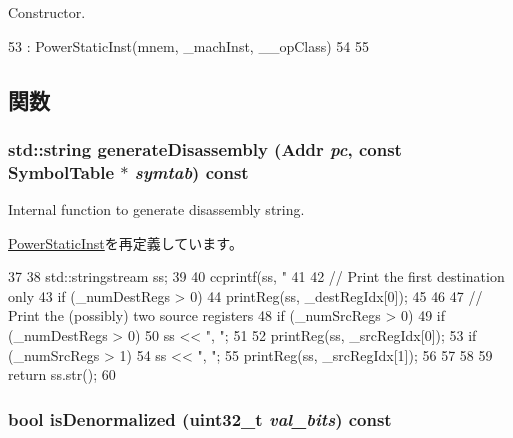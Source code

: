Constructor. 


\begin{DoxyCode}
53       : PowerStaticInst(mnem, _machInst, __opClass)
54     {
55     }
\end{DoxyCode}


\subsection{関数}
\hypertarget{classPowerISA_1_1FloatOp_a95d323a22a5f07e14d6b4c9385a91896}{
\subsubsection[{generateDisassembly}]{\setlength{\rightskip}{0pt plus 5cm}std::string generateDisassembly ({\bf Addr} {\em pc}, \/  const SymbolTable $\ast$ {\em symtab}) const}}
\label{classPowerISA_1_1FloatOp_a95d323a22a5f07e14d6b4c9385a91896}
Internal function to generate disassembly string. 

\hyperlink{classPowerISA_1_1PowerStaticInst_a95d323a22a5f07e14d6b4c9385a91896}{PowerStaticInst}を再定義しています。


\begin{DoxyCode}
37 {
38     std::stringstream ss;
39 
40     ccprintf(ss, "%
41 
42     // Print the first destination only
43     if (_numDestRegs > 0) {
44         printReg(ss, _destRegIdx[0]);
45     }
46 
47     // Print the (possibly) two source registers
48     if (_numSrcRegs > 0) {
49         if (_numDestRegs > 0) {
50             ss << ", ";
51         }
52         printReg(ss, _srcRegIdx[0]);
53         if (_numSrcRegs > 1) {
54           ss << ", ";
55           printReg(ss, _srcRegIdx[1]);
56         }
57     }
58 
59     return ss.str();
60 }
\end{DoxyCode}
\hypertarget{classPowerISA_1_1FloatOp_a4b69327a295ab68c9afab2f035119394}{
\subsubsection[{isDenormalized}]{\setlength{\rightskip}{0pt plus 5cm}bool isDenormalized ({\bf uint32\_\-t} {\em val\_\-bits}) const}}
\label{classPowerISA_1_1FloatOp_a4b69327a295ab68c9afab2f035119394}




